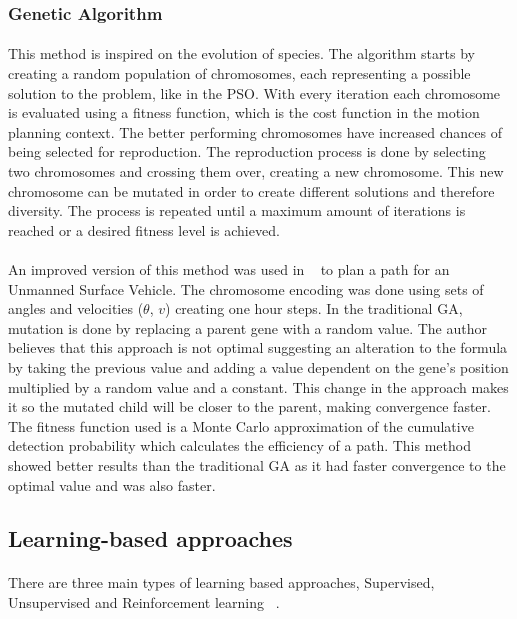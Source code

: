 \subsubsection{Genetic Algorithm}
\label{subsubsec:GA}
\paragraph{}This method is inspired on the evolution of species. The algorithm starts by creating a random population of chromosomes, each representing a 
possible solution to the problem, like in the \gls{PSO}. With every iteration each chromosome is evaluated using a 
fitness function, which is the cost function in the motion planning context. The better performing chromosomes have increased
chances of being selected for reproduction. The reproduction process is done by selecting two chromosomes and crossing them over, creating
a new chromosome. This new chromosome can be mutated in order to create different solutions and therefore diversity. The process is repeated until a maximum amount of iterations
is reached or a desired fitness level is achieved.
\paragraph{}An improved version of this method was used in ~\cite{guo2019optimal} to plan a path for an Unmanned Surface Vehicle. The 
chromosome encoding was done using sets of angles and velocities ($\theta$, $v$) creating one hour steps. In the traditional
GA, mutation is done by replacing a parent gene with a random value. The author believes that this 
approach is not optimal suggesting an alteration to the formula by taking the previous value and adding a 
value dependent on the gene's position multiplied by a random value and a constant. This change in the approach
makes it so the mutated child will be closer to the parent, making convergence faster. The fitness function used
is a Monte Carlo approximation of the cumulative detection probability which calculates the 
efficiency of a path. This method showed better results than the traditional \gls{GA} as it had faster convergence
to the optimal value and was also faster.
\subsection{Learning-based approaches}
\label{subsec:LB}
\paragraph{}There are three main types of learning based approaches, Supervised, Unsupervised and Reinforcement learning ~\cite{MLT1}.
